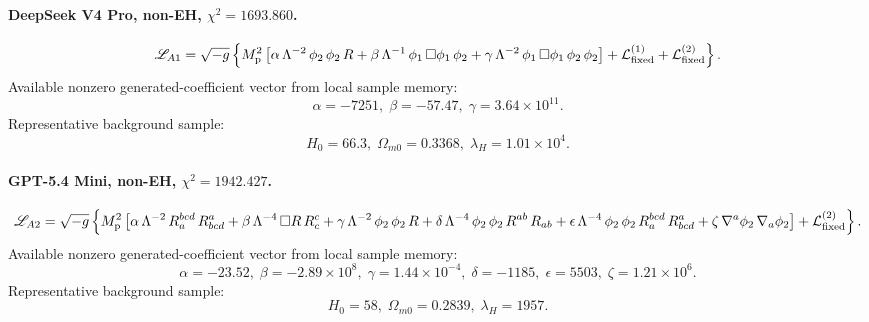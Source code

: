 \documentclass[aps,prd,twocolumn,superscriptaddress,nofootinbib,longbibliography]{revtex4-2}
\newcommand{\Mp}{M_{\rm p}}
\begin{document}
\begin{widetext}

\paragraph*{DeepSeek V4 Pro, non-EH, $\chi^2=1693.860$.}
\begin{equation}
\begin{split}
\mathscr{L}_{A1}
=\sqrt{-g}\left\{\Mp^2\left[\alpha\,\Lambda^{-2}\,\phi_2 \, \phi_2 \, R + \beta\,\Lambda^{-1}\,\phi_1 \, \Box \phi_1 \, \phi_2 + \gamma\,\Lambda^{-2}\,\phi_1 \, \Box \phi_1 \, \phi_2 \, \phi_2\right] + \mathcal{L}_{\rm fixed}^{(1)} + \mathcal{L}_{\rm fixed}^{(2)}\right\}.
\end{split}
\end{equation}
Available nonzero generated-coefficient vector from local sample memory:
\begin{equation}
\alpha=-7251,\; \beta=-57.47,\; \gamma=3.64\times10^{11}.
\end{equation}
Representative background sample:
\begin{equation}
H_0=66.3,\; \Omega_{m0}=0.3368,\; \lambda_H=1.01\times10^{4}.
\end{equation}


\paragraph*{GPT-5.4 Mini, non-EH, $\chi^2=1942.427$.}
\begin{equation}
\begin{split}
\mathscr{L}_{A2}
=\sqrt{-g}\left\{\Mp^2\left[\alpha\,\Lambda^{-2}\,R^{bcd}_{a} \, R^{a}_{bcd} + \beta\,\Lambda^{-4}\,\Box R \, R^{c}_{c} + \gamma\,\Lambda^{-2}\,\phi_2 \, \phi_2 \, R + \delta\,\Lambda^{-4}\,\phi_2 \, \phi_2 \, R^{ab} \, R_{ab} + \epsilon\,\Lambda^{-4}\,\phi_2 \, \phi_2 \, R^{bcd}_{a} \, R^{a}_{bcd} + \zeta\,\nabla^{a}\phi_2 \, \nabla_{a}\phi_2\right] + \mathcal{L}_{\rm fixed}^{(2)}\right\}.
\end{split}
\end{equation}
Available nonzero generated-coefficient vector from local sample memory:
\begin{equation}
\alpha=-23.52,\; \beta=-2.89\times10^{8},\; \gamma=1.44\times10^{-4},\; \delta=-1185,\; \epsilon=5503,\; \zeta=1.21\times10^{6}.
\end{equation}
Representative background sample:
\begin{equation}
H_0=58,\; \Omega_{m0}=0.2839,\; \lambda_H=1957.
\end{equation}



\end{widetext}
\end{document}
